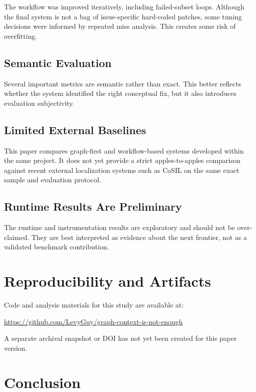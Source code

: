 \documentclass[11pt]{article}
\begin{document}
The workflow was improved iteratively, including failed-subset loops. Although the final system is not a bag of issue-specific hard-coded patches, some tuning decisions were informed by repeated miss analysis. This creates some risk of overfitting.

\subsection{Semantic Evaluation}

Several important metrics are semantic rather than exact. This better reflects whether the system identified the right conceptual fix, but it also introduces evaluation subjectivity.

\subsection{Limited External Baselines}

This paper compares graph-first and workflow-based systems developed within the same project. It does not yet provide a strict apples-to-apples comparison against recent external localization systems such as CoSIL on the same exact sample and evaluation protocol.

\subsection{Runtime Results Are Preliminary}

The runtime and instrumentation results are exploratory and should not be over-claimed. They are best interpreted as evidence about the next frontier, not as a validated benchmark contribution.

\section{Reproducibility and Artifacts}

Code and analysis materials for this study are available at:

\begin{center}
\small\url{https://github.com/LevyGuy/graph-context-is-not-enough}
\end{center}

A separate archival snapshot or DOI has not yet been created for this paper version.

\section{Conclusion}
\end{document}
